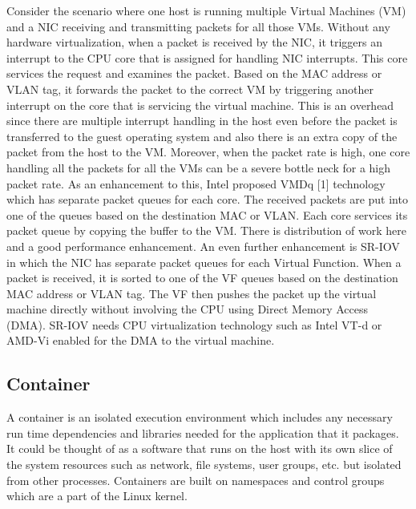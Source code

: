 \documentclass[english, 12pt, a4paper, elec, utf8, a-1b, online]{aaltothesis}
\begin{document}
Consider the scenario where one host is running multiple Virtual Machines (VM) and a NIC receiving and transmitting packets for all those VMs. Without any hardware virtualization, when a packet is received by the NIC, it triggers an interrupt to the CPU core that is assigned for handling NIC interrupts. This core services the request and examines the packet. Based on the MAC address or VLAN tag, it forwards the packet to the correct VM by triggering another interrupt on the core that is servicing the virtual machine. This is an overhead since there are multiple interrupt handling in the host even before the packet is transferred to the guest operating system and also there is an extra copy of the packet from the host to the VM. Moreover, when the packet rate is high, one core handling all the packets for all the VMs can be a severe bottle neck for a high packet rate. As an enhancement to this, Intel proposed VMDq [1] technology which has separate packet queues for each core. The received packets are put into one of the queues based on the destination MAC or VLAN. Each core services its packet queue by copying the buffer to the VM. There is distribution of work here and a good performance enhancement. An even further enhancement is SR-IOV in which the NIC has separate packet queues for each Virtual Function. When a packet is received, it is sorted to one of the VF queues based on the destination MAC address or VLAN tag. The VF then pushes the packet up the virtual machine directly without involving the CPU using Direct Memory Access (DMA). SR-IOV needs CPU virtualization technology such as Intel VT-d or AMD-Vi enabled for the DMA to the virtual machine.

\subsection{Container}
A container is an isolated execution environment which includes any necessary run time dependencies and libraries needed for the application that it packages. It could be thought of as a software that runs on the host with its own slice of the system resources such as network, file systems, user groups, etc. but isolated from other processes. Containers are built on namespaces and control groups which are a part of the Linux kernel.
\end{document}
